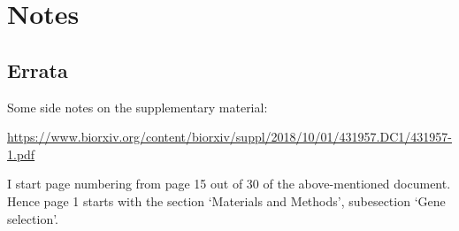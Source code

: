 \documentclass[12pt]{article}
\begin{document}
\section{Notes}
\subsection{Errata}
Some side notes on the supplementary material:

 \hspace*{-35pt}
\begin{small}
\href{https://www.biorxiv.org/content/biorxiv/suppl/2018/10/01/431957.DC1/431957-1.pdf}{
https://www.biorxiv.org/content/biorxiv/suppl/2018/10/01/431957.DC1/431957-1.pdf}
\end{small}

I start page numbering from page 15 out of 30 of the above-mentioned document. Hence page 1 starts with the section `Materials and Methods', subesection `Gene selection'.
\end{document}
